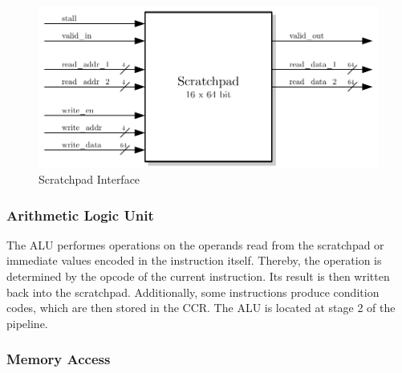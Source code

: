 \begin{figure}[htb]
 \centering
 \includegraphics[scale=1.0]{images/scratchpad_blackbox}
 \caption{Scratchpad Interface}
\label{fig:scp_inf}
\end{figure}


\subsubsection{Arithmetic Logic Unit}

The ALU performes operations on the operands read from the scratchpad or immediate values encoded in the instruction itself.
Thereby, the operation is determined by the opcode of the current instruction.
Its result is then written back into the scratchpad.
Additionally, some instructions produce condition codes, which are then stored in the CCR.
The ALU is located at stage 2 of the pipeline.

\subsubsection{Memory Access}\label{mem_access}

